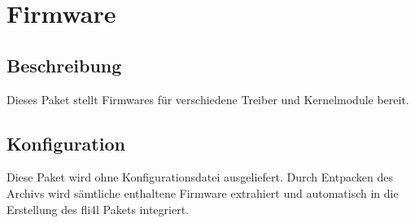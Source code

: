 {
\section {Firmware}
}

\subsection {Beschreibung}
  Dieses Paket stellt Firmwares für verschiedene Treiber und Kernelmodule
  bereit.\\

\subsection{Konfiguration}

  Diese Paket wird ohne Konfigurationsdatei ausgeliefert. Durch Entpacken des
  Archivs wird sämtliche enthaltene Firmware extrahiert und automatisch in die
  Erstellung des fli4l Pakets integriert.

